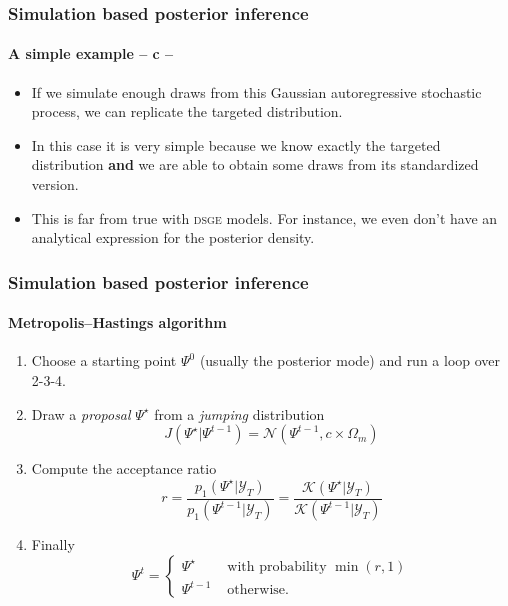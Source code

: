 \documentclass[10pt,slidestop]{beamer}
\newcommand{\sample}{\mathcal Y_T}
\begin{document}
\begin{frame}
  \frametitle{Simulation based posterior inference}
  \framesubtitle{A simple example -- c --}

    \begin{itemize}
        \item If we simulate enough draws from this Gaussian
        autoregressive stochastic process, we can replicate the
        targeted distribution.

\bigskip

        \item In this case it is very simple because we know exactly
        the targeted distribution \textbf{and} we are able to obtain
        some draws from its standardized version.

\bigskip

        \item This is far from true with \textsc{dsge} models. For
        instance, we even don't have an analytical expression for
        the posterior density.

    \end{itemize}

\end{frame}


\begin{frame}
  \frametitle{Simulation based posterior inference}
  \framesubtitle{Metropolis--Hastings algorithm}

    \begin{enumerate}
    \item Choose a starting point $\Psi^0$ (usually the posterior
      mode) and run a loop over 2-3-4.

\bigskip

        \item Draw a \emph{proposal} $\Psi^{\star}$ from a \emph{jumping} distribution
        \[
            J(\Psi^{\star}|\Psi^{t-1}) =
            \mathcal N(\Psi^{t-1},c\times\Omega_{m})
        \]

\bigskip

        \item Compute the acceptance ratio
        \[
            r = \frac{p_1(\Psi^{\star}|\sample)}{p_1(\Psi^{t-1}|\sample)} = \frac{\mathcal
            K(\Psi^{\star}|\sample)}{\mathcal K(\Psi^{t-1}|\sample)}
        \]

\bigskip

        \item Finally
        \[
            \Psi^t = \left\{
            \begin{array}{ll}
                \Psi^{\star} & \mbox{ with probability $\min(r,1)$}\\
                \Psi^{t-1} & \mbox{ otherwise.}
            \end{array}\right.
        \]
    \end{enumerate}
\end{frame}
\end{document}
